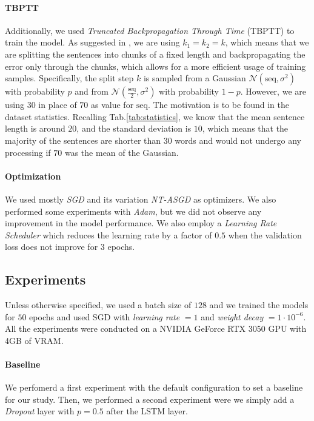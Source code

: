 \paragraph*{TBPTT}
Additionally, we used \emph{Truncated Backpropagation Through Time} (TBPTT) to train the model. As suggested in \cite{merity2017regularizing}, we are using $k_1 = k_2 = k$, which means that we are splitting the sentences into chunks of a fixed length and backpropagating the error only through the chunks, which allows for a more efficient usage of training samples. Specifically, the split step $k$ is sampled from a Gaussian $\mathcal{N}(\textrm{seq}, \sigma^2)$ with probability $p$ and from $\mathcal{N}(\frac{\textrm{seq}}{2}, \sigma^2)$ with probability $1-p$. However, we are using $30$ in place of $70$ as value for $\textrm{seq}$. The motivation is to be found in the dataset statistics. Recalling Tab.\ref{tab:statistics}, we know that the mean sentence length is around $20$, and the standard deviation is $10$, which means that the majority of the sentences are shorter than $30$ words and would not undergo any processing if $70$ was the mean of the Gaussian.

\paragraph*{Optimization}
We used mostly \emph{SGD} and its variation \emph{NT-ASGD}\cite{merity2017regularizing} as optimizers. We also performed some experiments with \emph{Adam}, but we did not observe any improvement in the model performance. We also employ a \emph{Learning Rate Scheduler} which reduces the learning rate by a factor of $0.5$ when the validation loss does not improve for $3$ epochs.

\subsection{Experiments}
Unless otherwise specified, we used a batch size of $128$ and we trained the models for $50$ epochs and used SGD with \emph{learning rate} $= 1$ and \emph{weight decay} $=1\cdot 10^{-6}$. All the experiments were conducted on a NVIDIA GeForce RTX 3050 GPU with 4GB of VRAM.
\paragraph*{Baseline} 
We perfomerd a first experiment with the default configuration to set a baseline for our study. Then, %
we performed a second experiment were we simply add a \emph{Dropout} layer with $p=0.5$ after the LSTM layer.%
